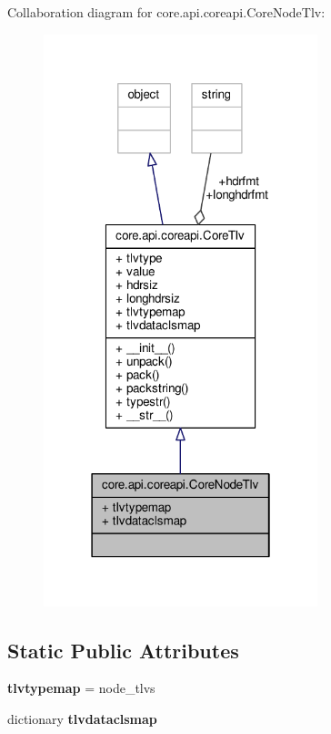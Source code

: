 Collaboration diagram for core.\+api.\+coreapi.\+Core\+Node\+Tlv\+:
\nopagebreak
\begin{figure}[H]
\begin{center}
\leavevmode
\includegraphics[width=226pt]{classcore_1_1api_1_1coreapi_1_1_core_node_tlv__coll__graph}
\end{center}
\end{figure}
\subsection*{Static Public Attributes}
\begin{DoxyCompactItemize}
\item 
\hypertarget{classcore_1_1api_1_1coreapi_1_1_core_node_tlv_a19e13827143b22b706fe78379a5d88d7}{{\bfseries tlvtypemap} = node\+\_\+tlvs}\label{classcore_1_1api_1_1coreapi_1_1_core_node_tlv_a19e13827143b22b706fe78379a5d88d7}

\item 
dictionary {\bfseries tlvdataclsmap}
\end{DoxyCompactItemize}
